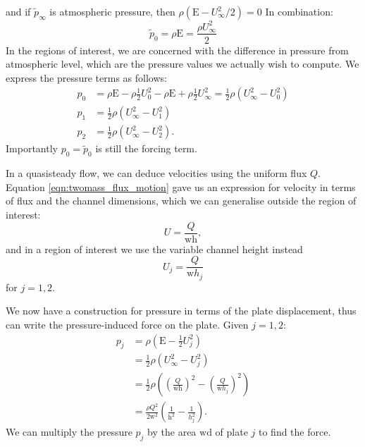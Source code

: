 and if $\tilde{p}_\infty$ is atmospheric pressure, then $\rho(\mathrm{E} - U_\infty^2/2) = 0$
In combination:
\begin{equation}
    \tilde{p}_0 = \rho \mathrm{E} = \frac{\rho U_\infty^2}{2}
\end{equation}
In the regions of interest, we are concerned with the difference in pressure from atmospheric level,
which are the pressure values we actually wish to compute.
We express the pressure terms as follows:
\begin{equation}
    \begin{aligned}
        p_0 &= \rho\mathrm{E} - \rho\frac{1}{2}U_0^2 - \rho\mathrm{E} + \rho\frac{1}{2}U_\infty^2 = \frac{1}{2}\rho\left(U_\infty^2 - U_0^2\right) \\
        p_1 &= \frac{1}{2}\rho\left(U_\infty^2 - U_1^2\right) \\
        p_2 &= \frac{1}{2}\rho\left(U_\infty^2 - U_2^2\right).
    \end{aligned}
\end{equation}
Importantly \(p_0 = \tilde{p}_0\) is still the forcing term.


In a quasisteady flow,
we can deduce velocities using the uniform flux $Q$.
Equation \ref{eqn:twomass_flux_motion} gave us an expression for velocity in terms of flux and the channel dimensions,
which we can generalise outside the region of interest:
\begin{equation}
    U = \frac{Q}{\mathrm{wh}},
\end{equation}
and in a region of interest we use the variable channel height instead
\begin{equation}
    U_j = \frac{Q}{\mathrm{w}h_j}
\end{equation}
for \(j=1,2\).

We now have a construction for pressure in terms of the plate displacement, thus can write the pressure-induced force on the plate.
Given \(j=1,2:\)
\begin{equation}
    \begin{aligned}
        p_j &= \rho\left(\mathrm{E} - \frac{1}{2}U_j^2 \right) \\
        &= \frac{1}{2}\rho\left(U_\infty^2 - U_j^2\right) \\
        &= \frac{1}{2}\rho\left( \left(\frac{Q}{\mathrm{wh}}\right)^2 - \left(\frac{Q}{\mathrm{w}h_j}\right)^2 \right) \\
        &= \frac{\rho Q^2}{2\mathrm{w}^2}\left( \frac{1}{\mathrm{h}^2} - \frac{1}{h_j^2} \right).
    \end{aligned}
    \label{eqn:twomass_pressureterm}
\end{equation}
We can multiply the pressure $p_j$ by the area $\mathrm{wd}$ of plate $j$ to find the force.

